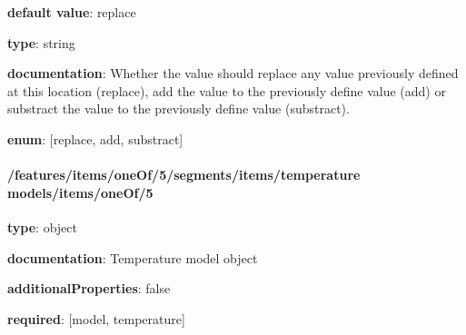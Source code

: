 \begin{itemized}
\item {\bf default value}: replace
\item {\bf type}: string
\item {\bf documentation}: Whether the value should replace any value previously defined at this location (replace), add the value to the previously define value (add) or substract the value to the previously define value (substract).
\item {\bf enum}: [replace, add, substract]\end{itemized}\paragraph{/features/items/oneOf/5/segments/items/temperature models/items/oneOf/5} \begin{itemized}
\item {\bf type}: object
\item {\bf documentation}: Temperature model object
\item {\bf additionalProperties}: false
\item {\bf required}: [model, temperature]\end{itemized}
